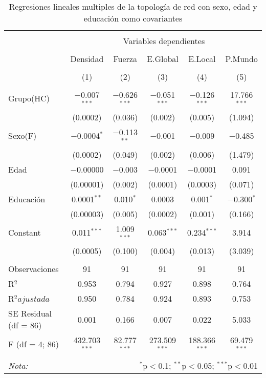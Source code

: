 \begin{table}[!htbp] \centering
  \caption{Regresiones lineales multiples de la topología de red con sexo, edad y educación como covariantes}
  \label{tab:lmHC}
  \small
\begin{tabular}{@{\extracolsep{5pt}}lccccc}
\\[-1.8ex]\hline
\hline \\[-1.8ex]
 & \multicolumn{5}{c}{Variables dependientes} \\
\cline{2-6}
\\[-1.8ex] & Densidad & Fuerza & E.Global & E.Local & P.Mundo \\
\\[-1.8ex] & (1) & (2) & (3) & (4) & (5)\\
\hline \\[-1.8ex]
 Grupo(HC) & $-$0.007$^{***}$ & $-$0.626$^{***}$ & $-$0.051$^{***}$ & $-$0.126$^{***}$ & 17.766$^{***}$ \\
  & (0.0002) & (0.036) & (0.002) & (0.005) & (1.094) \\
  Sexo(F) & $-$0.0004$^{*}$ & $-$0.113$^{**}$ & $-$0.001 & $-$0.009 & $-$0.485 \\
  & (0.0002) & (0.049) & (0.002) & (0.006) & (1.479) \\
  Edad & $-$0.00000 & $-$0.003 & $-$0.0001 & $-$0.0001 & 0.091 \\
  & (0.00001) & (0.002) & (0.0001) & (0.0003) & (0.071) \\
  Educación & 0.0001$^{**}$ & 0.010$^{*}$ & 0.0003 & 0.001$^{*}$ & $-$0.300$^{*}$ \\
  & (0.00003) & (0.005) & (0.0002) & (0.001) & (0.166) \\
  Constant & 0.011$^{***}$ & 1.009$^{***}$ & 0.063$^{***}$ & 0.234$^{***}$ & 3.914 \\
  & (0.0005) & (0.100) & (0.004) & (0.013) & (3.039) \\
 \hline \\[-1.8ex]
Observaciones & 91 & 91 & 91 & 91 & 91 \\
R$^{2}$ & 0.953 & 0.794 & 0.927 & 0.898 & 0.764 \\
R$^{2} ajustada$ & 0.950 & 0.784 & 0.924 & 0.893 & 0.753 \\
SE Residual (df = 86) & 0.001 & 0.166 & 0.007 & 0.022 & 5.033 \\
F (df = 4; 86) & 432.703$^{***}$ & 82.777$^{***}$ & 273.509$^{***}$ & 188.366$^{***}$ & 69.479$^{***}$ \\
\hline
\hline \\[-1.8ex]
\textit{Nota:}  & \multicolumn{5}{r}{$^{*}$p$<$0.1; $^{**}$p$<$0.05; $^{***}$p$<$0.01} \\
\end{tabular}
\end{table}

